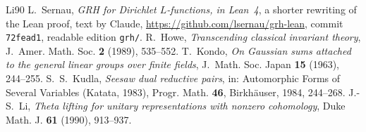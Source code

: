 \documentclass[reqno]{amsart}
\theoremstyle{definition}
\theoremstyle{plain}
\begin{document}
\begin{thebibliography}{Li90}
 L.~Sernau, \emph{GRH for Dirichlet \(L\)-functions, in Lean~4}, a shorter rewriting of the Lean proof, text by Claude, \url{https://github.com/lsernau/grh-lean}, commit \texttt{72fead1}, readable edition \texttt{grh/}.
 R.~Howe, \emph{Transcending classical invariant theory}, J.~Amer. Math. Soc. \textbf{2} (1989), 535--552.
 T.~Kondo, \emph{On Gaussian sums attached to the general linear groups over finite fields}, J.~Math. Soc. Japan \textbf{15} (1963), 244--255.
 S.~S.~Kudla, \emph{Seesaw dual reductive pairs}, in: Automorphic Forms of Several Variables (Katata, 1983), Progr. Math. \textbf{46}, Birkh\"auser, 1984, 244--268.
 J.-S.~Li, \emph{Theta lifting for unitary representations with nonzero cohomology}, Duke Math. J. \textbf{61} (1990), 913--937.
\end{thebibliography}
\end{document}
